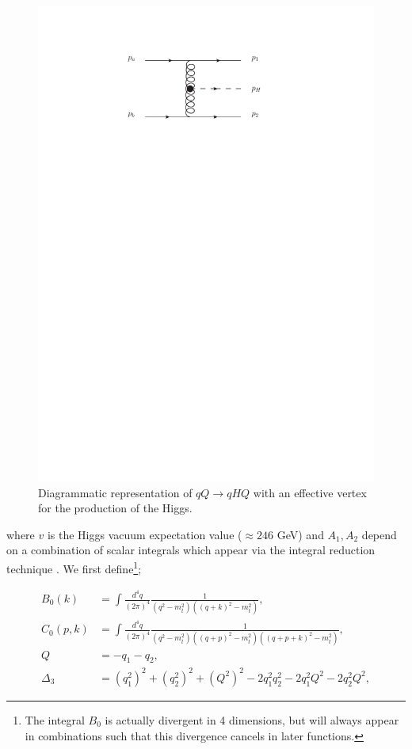 \begin{figure}[t]
\centering
\includegraphics{Images/qQh_eff.pdf}
\caption{Diagrammatic representation of $qQ \to qHQ$ with an effective vertex for the production of the Higgs.}
\label{fig:qQh_eff}
\end{figure}

where $v$ is the Higgs vacuum expectation value ($\approx 246$ GeV) and $A_1, A_2$ depend on a combination of scalar integrals which appear via the integral reduction technique \cite{Chetyrkin1981}. We first define\footnote{The integral $B_0$ is actually divergent in 4 dimensions, but will always appear in combinations such that this divergence cancels in later functions.};

\begin{equation}
\begin{split}
B_0(k) &= \int \frac{d^4 q}{(2 \pi)^4} \frac{1}{(q^2-m_t^2)((q+k)^2-m_t^2)}, \\
C_0(p,k) &= \int \frac{d^4 q}{(2 \pi)^4} \frac{1}{(q^2-m_t^2)((q+p)^2-m_t^2)((q+p+k)^2-m_t^2)}, \\
Q &= -q_1 - q_2, \\
\Delta_3 &= (q_1^2)^2 + (q_2^2)^2 + (Q^2)^2 - 2 q_1^2 q_2^2 - 2q_1^2Q^2 - 2q_2^2Q^2,
\end{split}
\label{eqn:scalars}
\end{equation}

